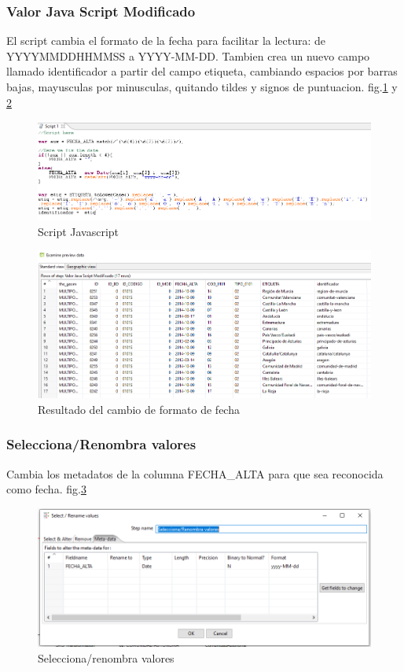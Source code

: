\subsubsection{Valor Java Script Modificado}
El script cambia el formato de la fecha para facilitar la lectura: de YYYYMMDDHHMMSS a YYYY-MM-DD. Tambien
crea un nuevo campo llamado identificador a partir del campo etiqueta, cambiando espacios por barras bajas, mayusculas
por minusculas, quitando tildes y signos de puntuacion. fig.\ref{fig:script} y \ref{fig:fecha}

\begin{figure}[H]
    \includegraphics[width=\textwidth]{images/script.png}
    \centering
    \caption{Script Javascript}
    \label{fig:script}
\end{figure}

\begin{figure}[H]
    \includegraphics[width=\textwidth]{images/fecha.png}
    \centering
    \caption{Resultado del cambio de formato de fecha}
    \label{fig:fecha}
\end{figure}

\subsubsection{Selecciona/Renombra valores}
Cambia los metadatos de la columna FECHA\_ALTA para que sea reconocida como fecha. fig.\ref{fig:selecciona-renombra}

\begin{figure}[H]
    \includegraphics[width=\textwidth]{images/selecciona-renombra.png}
    \centering
    \caption{Selecciona/renombra valores}
    \label{fig:selecciona-renombra}
\end{figure}

